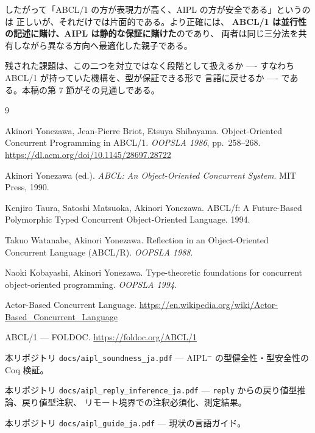 \documentclass[11pt,a4paper]{ltjsarticle}
\theoremstyle{remark}
\begin{document}
したがって「ABCL/1 の方が表現力が高く、AIPL の方が安全である」というのは
正しいが、それだけでは片面的である。より正確には、
\textbf{ABCL/1 は並行性の記述に賭け、AIPL は静的な保証に賭けた}のであり、
両者は同じ三分法を共有しながら異なる方向へ最適化した親子である。

残された課題は、この二つを対立ではなく段階として扱えるか
---- すなわち ABCL/1 が持っていた機構を、型が保証できる形で
言語に戻せるか ---- である。本稿の第 7 節がその見通しである。

\begin{thebibliography}{9}

Akinori Yonezawa, Jean-Pierre Briot, Etsuya Shibayama.
\newblock Object-Oriented Concurrent Programming in ABCL/1.
\newblock \emph{OOPSLA 1986}, pp.~258--268.
\newblock \url{https://dl.acm.org/doi/10.1145/28697.28722}

Akinori Yonezawa (ed.).
\newblock \emph{ABCL: An Object-Oriented Concurrent System}.
\newblock MIT Press, 1990.

Kenjiro Taura, Satoshi Matsuoka, Akinori Yonezawa.
\newblock ABCL/f: A Future-Based Polymorphic Typed Concurrent
Object-Oriented Language. 1994.

Takuo Watanabe, Akinori Yonezawa.
\newblock Reflection in an Object-Oriented Concurrent Language (ABCL/R).
\newblock \emph{OOPSLA 1988}.

Naoki Kobayashi, Akinori Yonezawa.
\newblock Type-theoretic foundations for concurrent object-oriented
programming.
\newblock \emph{OOPSLA 1994}.

Actor-Based Concurrent Language.
\newblock \url{https://en.wikipedia.org/wiki/Actor-Based_Concurrent_Language}

ABCL/1 --- FOLDOC.
\newblock \url{https://foldoc.org/ABCL/1}

本リポジトリ \texttt{docs/aipl\_soundness\_ja.pdf} ---
  AIPL$^-$ の型健全性・型安全性の Coq 検証。

本リポジトリ \texttt{docs/aipl\_reply\_inference\_ja.pdf} ---
  \texttt{reply} からの戻り値型推論、戻り値型注釈、
  リモート境界での注釈必須化、測定結果。

本リポジトリ \texttt{docs/aipl\_guide\_ja.pdf} --- 現状の言語ガイド。

\end{thebibliography}
\end{document}
